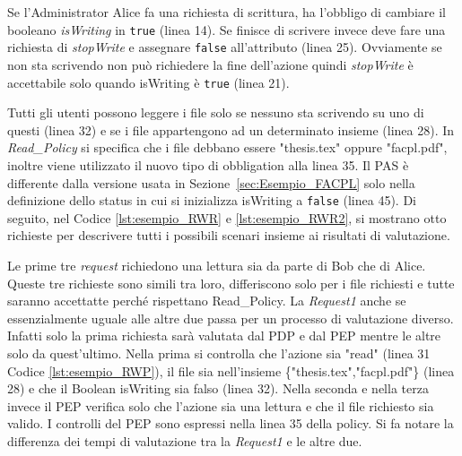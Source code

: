 Se l'Administrator Alice fa una richiesta di scrittura, ha l'obbligo di cambiare il booleano \emph{isWriting} in \texttt{true} (linea 14).
Se finisce di scrivere invece deve fare una richiesta di \emph{stopWrite} e assegnare \texttt{false} all'attributo (linea 25).
Ovviamente se non sta scrivendo non può richiedere la fine dell'azione quindi \emph{stopWrite} è accettabile solo quando
isWriting è \texttt{true} (linea 21).

\vspace{1em}
Tutti gli utenti possono leggere i file solo se nessuno sta scrivendo su uno di questi (linea 32) e
se i file appartengono ad un determinato insieme (linea 28). In \emph{Read\_Policy} si specifica che i
file debbano essere "thesis.tex" oppure "facpl.pdf", inoltre viene utilizzato il nuovo tipo di obbligation alla linea 35.
Il \ac{PAS} è differente dalla versione usata in Sezione~\ref{sec:Esempio_FACPL} solo nella definizione dello status
in cui si inizializza isWriting a \texttt{false} (linea 45).
\clearpage
\label{lst:esempio_RWP2}
Di seguito, nel Codice \ref{lst:esempio_RWR} e \ref{lst:esempio_RWR2}, si mostrano otto richieste per descrivere tutti i possibili scenari
insieme ai risultati di valutazione. \par
Le prime tre \emph{request} richiedono una lettura sia da parte di Bob che di Alice. Queste tre richieste sono simili tra loro,
differiscono solo per i file richiesti e tutte saranno accettatte perché rispettano Read\_Policy. La \emph{Request1} anche
se essenzialmente uguale alle altre due passa per un processo di valutazione diverso. Infatti solo la prima richiesta
sarà valutata dal \ac{PDP} e dal \ac{PEP} mentre le altre solo da quest'ultimo.
Nella prima si controlla che l'azione sia "read" (linea 31 Codice \ref{lst:esempio_RWP}),
il file sia nell'insieme \{"thesis.tex","facpl.pdf"\} (linea 28) e che il Boolean isWriting sia falso (linea 32).
Nella seconda e nella terza invece il \ac{PEP} verifica solo che l'azione sia una lettura e che il file richiesto sia valido.
I controlli del \ac{PEP} sono espressi nella linea 35 della policy. Si fa notare la differenza dei tempi di valutazione
tra la \emph{Request1} e le altre due.
\clearpage


